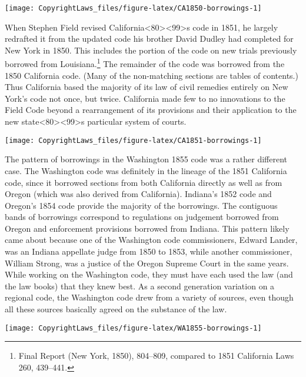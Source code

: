 \documentclass[12pt,]{article}
\let\rmarkdownfootnote\footnote%
\def\footnote{\protect\rmarkdownfootnote}
\begin{document}
\begin{center}\texttt{[image: CopyrightLaws\_files/figure-latex/CA1850-borrowings-1]} \end{center}

When Stephen Field revised
California\textless80\textgreater\textless99\textgreater s code in 1851,
he largely redrafted it from the updated code his brother David Dudley
had completed for New York in 1850. This includes the portion of the
code on new trials previously borrowed from Louisiana.\footnote{Final
  Report (New York, 1850), 804--809, compared to 1851 California Laws
  260, 439--441.} The remainder of the code was borrowed from the 1850
California code. (Many of the non-matching sections are tables of
contents.) Thus California based the majority of its law of civil
remedies entirely on New York's code not once, but twice. California
made few to no innovations to the Field Code beyond a rearrangement of
its provisions and their application to the new
state\textless80\textgreater\textless99\textgreater s particular system
of courts.

\begin{center}\texttt{[image: CopyrightLaws\_files/figure-latex/CA1851-borrowings-1]} \end{center}

The pattern of borrowings in the Washington 1855 code was a rather
different case. The Washington code was definitely in the lineage of the
1851 California code, since it borrowed sections from both California
directly as well as from Oregon (which was also derived from
California). Indiana's 1852 code and Oregon's 1854 code provide the
majority of the borrowings. The contiguous bands of borrowings
correspond to regulations on judgement borrowed from Oregon and
enforcement provisions borrowed from Indiana. This pattern likely came
about because one of the Washington code commissioners, Edward Lander,
was an Indiana appellate judge from 1850 to 1853, while another
commissioner, William Strong, was a justice of the Oregon Supreme Court
in the same years. While working on the Washington code, they must have
each used the law (and the law books) that they knew best. As a second
generation variation on a regional code, the Washington code drew from a
variety of sources, even though all these sources basically agreed on
the substance of the law.

\begin{center}\texttt{[image: CopyrightLaws\_files/figure-latex/WA1855-borrowings-1]} \end{center}
\end{document}
